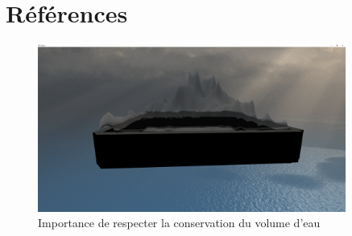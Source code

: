 \documentclass[a4paper, 12pt]{article} %
\begin{document}
\section{Références}

\begin{figure}
	\centering
	\includegraphics[width=0.9\textwidth]{./PhotoRapport/WaterConservation.png}
	\caption{Importance de respecter la conservation du volume d'eau}
	\label{WaterConservation}
\end{figure}
\end{document}

